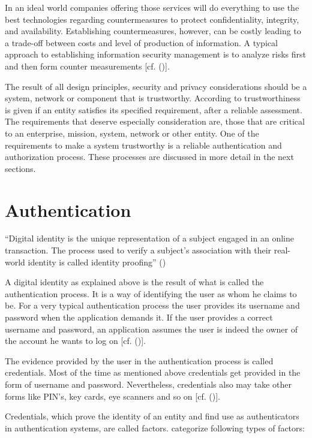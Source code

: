 In an ideal world companies offering those services will do everything to use the best technologies regarding countermeasures to protect confidentiality, integrity, and availability. Establishing countermeasures, however, can be costly leading to a trade-off between costs and level of production of information. A typical approach to establishing information security management is to analyze risks first and then form counter measurements [cf. (\cite{Todorov:2007:MUI})]. 

The result of all design principles, security and privacy considerations should be a system, network or component that is trustworthy. According to \cite{Neumann:2018:PTC} trustworthiness is given if an entity satisfies its specified requirement, after a reliable assessment. The requirements that deserve especially consideration are, those that are critical to an enterprise, mission, system, network or other entity. One of the requirements to make a system trustworthy is a reliable authentication and authorization process. These processes are discussed in more detail in the next sections.
	

\section{Authentication}

“Digital identity is the unique representation of a subject engaged in an online transaction. The process used to verify a subject’s association with their real-world identity is called identity proofing” (\citet{NIST:2017:DIG})

A digital identity as explained above is the result of what is called the authentication process. It is a way of identifying the user as whom he claims to be. For a very typical authentication process the user provides its username and password when the application demands it. If the user provides a correct username and password, an application assumes the user is indeed the owner of the account he wants to log on [cf. (\citet{Boyed:2012:GSOA})]. 

The evidence provided by the user in the authentication process is called credentials. Most of the time as mentioned above credentials get provided in the form of username and password. Nevertheless, credentials also may take other forms like PIN’s, key cards, eye scanners and so on [cf. (\citet{Todorov:2007:MUI})]. 

Credentials, which prove the identity of an entity and find use as authenticators in authentication systems, are called factors. \citet{NIST:2017:DIG} categorize following types of factors:

